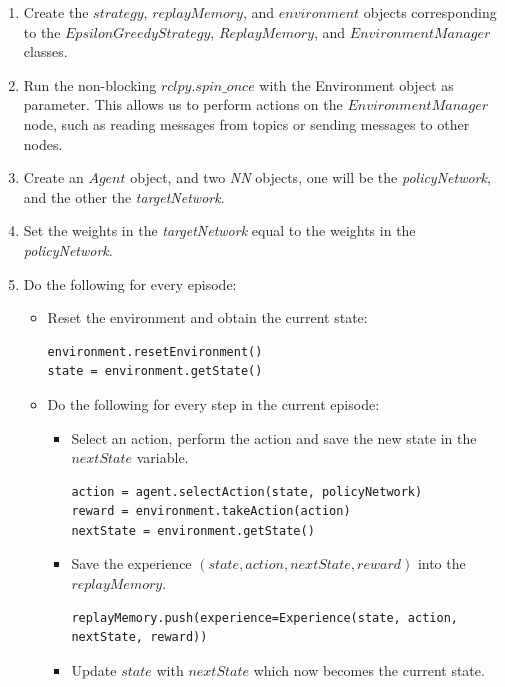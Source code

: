 \documentclass[12pt,oneside]{article}
\begin{document}
\begin{enumerate}
\item Create the $strategy$, $replayMemory$, and $environment$ objects corresponding to the $EpsilonGreedyStrategy$, $ReplayMemory$, and $EnvironmentManager$ classes.
\item Run the non-blocking $rclpy.spin\_once$ with the Environment object as parameter. This allows us to perform actions on the $EnvironmentManager$ node, such as reading messages from topics or sending messages to other nodes.
\item Create an $Agent$ object, and two \textit{NN} objects, one will be the \textit{policyNetwork}, and the other the \textit{targetNetwork}.
\item Set the weights in the \textit{targetNetwork} equal to the weights in the \textit{policyNetwork}.
\item Do the following for every episode:
	\begin{itemize}
		\item Reset the environment and obtain the current state:
\begin{tcolorbox}[]
\begin{verbatim}
environment.resetEnvironment()
state = environment.getState()
\end{verbatim}
\end{tcolorbox}
		\item Do the following for every step in the current episode:
		\begin{itemize}
			\item Select an action, perform the action and save the new state in the $nextState$ variable.
\begin{tcolorbox}[]
\begin{verbatim}
action = agent.selectAction(state, policyNetwork)
reward = environment.takeAction(action)
nextState = environment.getState()
\end{verbatim}
\end{tcolorbox}
			\item Save the experience $(state, action, nextState, reward)$ into the $replayMemory$.
\begin{tcolorbox}[]
\begin{verbatim}
replayMemory.push(experience=Experience(state, action, nextState, reward))
\end{verbatim}
\end{tcolorbox}
			\item Update $state$ with $nextState$ which now becomes the current state.

\end{itemize}
\end{itemize}
\end{enumerate}
\end{document}
